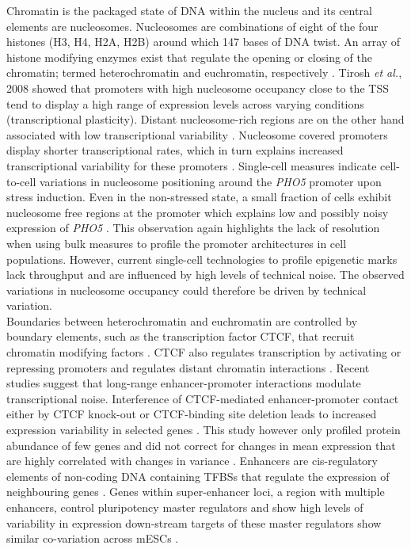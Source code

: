 Chromatin is the packaged state of DNA within the nucleus and its central elements are nucleosomes. 
Nucleosomes are combinations of eight of the four histones (H3, H4, H2A, H2B) around which 147 bases of DNA twist. 
An array of histone modifying enzymes exist that regulate the opening or closing of the chromatin; termed heterochromatin and euchromatin, respectively \citep{Kouzarides2007}. 
Tirosh \textit{et al.}, 2008 showed that promoters with high nucleosome occupancy close to the TSS tend to display a high range of expression levels across varying conditions (transcriptional plasticity). 
Distant nucleosome-rich regions are on the other hand associated with low transcriptional variability \citep{Tirosh2008}. 
Nucleosome covered promoters display shorter transcriptional rates, which in turn explains increased transcriptional variability for these promoters \cite{Dey2015}. 
Single-cell measures indicate cell-to-cell variations in nucleosome positioning around the \textit{PHO5} promoter upon stress induction. 
Even in the non-stressed state, a small fraction of cells exhibit nucleosome free regions at the promoter which explains low and possibly noisy expression of \textit{PHO5} \citep{Small2014}.
This observation again highlights the lack of resolution when using bulk measures to profile the promoter architectures in cell populations.
However, current single-cell technologies to profile epigenetic marks lack throughput and are influenced by high levels of technical noise.
The observed variations in nucleosome occupancy could therefore be driven by technical variation. \\

Boundaries between heterochromatin and euchromatin are controlled by boundary elements, such as the transcription factor \Gls{CTCF}, that recruit chromatin modifying factors \citep{Kouzarides2007}. 
CTCF also regulates transcription by activating or repressing promoters and regulates distant chromatin interactions \citep{Kim2015a}. 
Recent studies suggest that long-range enhancer-promoter interactions modulate transcriptional noise. 
Interference of CTCF-mediated enhancer-promoter contact either by CTCF knock-out or CTCF-binding site deletion leads to increased expression variability in selected genes \citep{Ren2017}. 
This study however only profiled protein abundance of few genes and did not correct for changes in mean expression that are highly correlated with changes in variance \cite{Brennecke2013}.
Enhancers are cis-regulatory elements of non-coding DNA containing TFBSs that regulate the expression of neighbouring genes \citep{Blackwood1998}. 
Genes within super-enhancer loci, a region with multiple enhancers, control pluripotency master regulators and show high levels of variability in expression down-stream targets of these master regulators show similar co-variation across mESCs \citep{Faure2017}.

